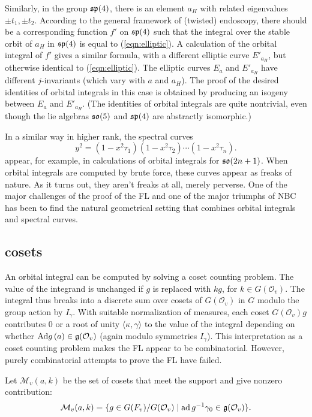 \documentclass[brochure,english,12pt]{bourbaki}
\def\op#1{{\operatorname{#1}}}
\def\so{\frak{so}}
\def\sp{\frak{sp}}
\def\g{\frak{g}}
\def\M{{\mathcal M}}
\def\O{{\mathcal O}}
\begin{document}
Similarly, in the group $\sp(4)$, there is an element ${a_H}$ with
related eigenvalues $\pm t_1,\pm t_2$.  According to the general
framework of (twisted) endoscopy, there should be a corresponding
function $f'$ on $\sp(4)$ such that the integral over the stable orbit
of ${a_H}$ in $\sp(4)$ is equal to (\ref{eqn:elliptic}).  A
calculation of the orbital integral of $f'$ gives a similar formula,
with a different elliptic curve $E'_{a_H}$, but otherwise identical to
(\ref{eqn:elliptic}).  The elliptic curves $E_a$ and $E'_{a_H}$ have
different $j$-invariants (which vary with $a$ and ${a_H}$).  The proof
of the desired identities of orbital integrals in this case is
obtained by producing an isogeny between $E_a$ and $E'_{a_H}$.  (The
identities of orbital integrals are quite nontrivial, even though the
lie algebras $\so(5)$ and $\sp(4)$ are abstractly isomorphic.)

In a similar way in higher rank,  the spectral curves
\[
y^2 = (1-x^2 \tau_1)(1-x^2 \tau_2)\cdots (1-x^2 \tau_n).
\]
appear, for example, in calculations of orbital integrals for
$\so(2n+1)$.  When orbital integrals are computed by brute force,
these curves appear as freaks of nature.  As it turns
out, they aren't freaks at all, merely perverse.  One of the major
challenges of the proof of the FL and one of the major
triumphs of NBC has been to find the natural geometrical setting that combines
orbital integrals and spectral curves.


\subsection{cosets}\label{sec:coset}

An orbital integral can be computed by solving a coset counting
problem.  The value of the integrand is unchanged if $g$ is replaced
with $k g$, for $k\in G(\O_v)$.  The integral thus breaks into a
discrete sum over cosets of $G(\O_v)$ in $G$ modulo the group action
by $I_\gamma$.  With suitable normalization of measures, each coset
$G(\O_v)g$ contributes $0$ or a root of unity $\langle\kappa,\gamma\rangle$
to the value of the integral depending on whether $\op{Ad}g\,(a) \in
\g(\O_v)$ (again modulo symmetries $I_\gamma$).  This interpretation as a
coset counting problem makes the FL appear to be combinatorial.
However, purely combinatorial attempts to prove the FL have failed.

Let $\M_v(a,k)$ be the set of cosets that meet the support and give nonzero contribution:
\[
\M_v(a,k) = \{g\in G(F_v)/G(\O_v) \mid \op{ad}\,g^{-1} \gamma_0 \in \g(\O_v)\}.
\]
\end{document}
